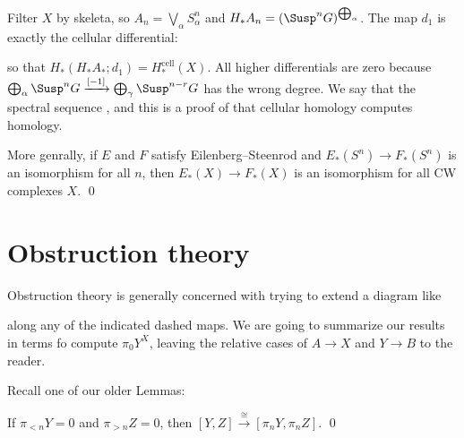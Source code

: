 \begin{example}
Filter $X$ by skeleta, so $A_n = \bigvee_\alpha S^n_\alpha$ and $H_* A_n = (\Susp^n G)^{\bigoplus_\alpha}$.  The map $d_1$ is exactly the cellular differential:
\begin{center}
\end{center}
so that $H_*(H_* A_*; d_1) = H_*^{\mathrm{cell}}(X)$.  All higher differentials are zero because $\bigoplus_\alpha \Susp^n G \xrightarrow{[-1]} \bigoplus_\gamma \Susp^{n-r} G$ has the wrong degree.  We say that the spectral sequence , and this is a proof of that cellular homology computes homology.
\end{example}

\begin{corollary}
More genrally, if $E$ and $F$ satisfy Eilenberg--Steenrod and $E_*(S^n) \to F_*(S^n)$ is an isomorphism for all $n$, then $E_*(X) \to F_*(X)$ is an isomorphism for all CW complexes $X$. \qed
\end{corollary}




\section{Obstruction theory}

Obstruction theory is generally concerned with trying to extend a diagram like
\begin{center}
\end{center}
along any of the indicated dashed maps.  We are going to summarize our results in terms fo compute $\pi_0 Y^X$, leaving the relative cases of $A \to X$ and $Y \to B$ to the reader.

Recall one of our older Lemmas:
\begin{lemma}
If $\pi_{<n} Y = 0$ and $\pi_{>n} Z = 0$, then $[Y, Z] \xrightarrow\cong [\pi_n Y, \pi_n Z]$. \qed
\end{lemma}

